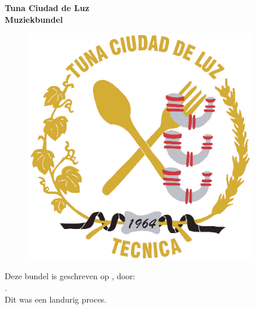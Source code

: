 \begin{titlepage}
\begin{center}
\textbf{\Huge Tuna Ciudad de Luz \\Muziekbundel}
\vfill
\end{center}
\begin{figure}[h]
\centering
\includegraphics[width=0.9\textwidth]{logo}
\end{figure}
\vfill
\makeatletter
Deze bundel is geschreven op \@date, door:\\
\@author.\\
Dit was een landurig proces.
\makeatother
\end{titlepage}
